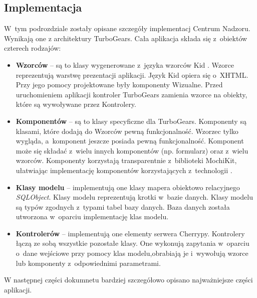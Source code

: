 \subsection{Implementacja}
W~tym podrozdziale zostały opisane szczegóły implementacj Centrum Nadzoru.
Wynikają one z architektury TurboGears. Cała aplikacja składa się z~obiektów
czterech rodzajów:
\begin{itemize}
	\item \textbf{Wzorców} -- są to klasy wygenerowane z~języka wzorców Kid
		\cite{KID}. Wzorce reprezentują warstwę prezentacji aplikacji. Język Kid
		opiera się o~XHTML. Przy jego pomocy projektowane były komponenty Wizualne.
		Przed uruchomieniem aplikacji kontroler TurboGears zamienia wzorce na
		obiekty, które są wywoływane przez Kontrolery. 
	\item \textbf{Komponentów} -- są to klasy specyficzne dla TurboGears.
		Komponenty są klasami, które dodają do Wzorców pewną funkcjonalność. Wzorzec
		tylko wygląda, a~komponent jeszcze posiada pewną funkcjonalność. Komponent
		może się składać z~wielu innych komponentów (np. formularz) oraz z~wielu
		wzorców. Komponenty korzystają transparentnie z~biblioteki MochiKit,
		ułatwiając implementację komponentów korzystających z~technologii
		.
	\item \textbf{Klasy modelu} -- implementują one klasy mapera obiektowo
		relacyjnego \emph{SQLObject}. Klasy modelu reprezentują krotki w~bazie
		danych. Klasy modelu są typów zgodnych z~typami tabel bazy danych. Baza
		danych została utworzona w~oparciu implementację klas modelu.
	\item \textbf{Kontrolerów} -- implementują one elementy serwera Cherrypy.
		Kontrolery łączą ze sobą wszystkie pozostałe klasy. One wykonują zapytania
		w~oparciu o~dane wejściowe przy pomocy klas modelu,obrabiają je i~wywołują
		wzorce lub komponenty z~odpowiednimi parametrami.
\end{itemize}
W następnej części dokumnetu bardziej szczegółowo opisano najważniejsze części
aplikacji.

